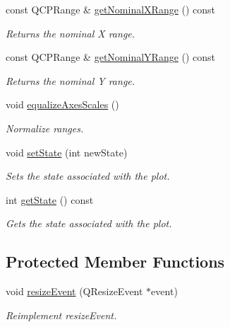 \begin{DoxyCompactItemize}
const Q\+C\+P\+Range \& \hyperlink{classSGCustomPlot_abc4224d3185bed305f40646626e30625}{get\+Nominal\+X\+Range} () const
\begin{DoxyCompactList}\small\item\em Returns the nominal X range. \end{DoxyCompactList}\item 
\mbox{\label{classSGCustomPlot_a52e0a60a726ebd157839b013af068420}} 
const Q\+C\+P\+Range \& \hyperlink{classSGCustomPlot_a52e0a60a726ebd157839b013af068420}{get\+Nominal\+Y\+Range} () const
\begin{DoxyCompactList}\small\item\em Returns the nominal Y range. \end{DoxyCompactList}\item 
\mbox{\label{classSGCustomPlot_ae69a5b83aab673e813bc48c9e5b8a0bd}} 
void \hyperlink{classSGCustomPlot_ae69a5b83aab673e813bc48c9e5b8a0bd}{equalize\+Axes\+Scales} ()
\begin{DoxyCompactList}\small\item\em Normalize ranges. \end{DoxyCompactList}\item 
\mbox{\label{classSGCustomPlot_a7583d7141ffd1a751f01f22b23c50e5a}} 
void \hyperlink{classSGCustomPlot_a7583d7141ffd1a751f01f22b23c50e5a}{set\+State} (int new\+State)
\begin{DoxyCompactList}\small\item\em Sets the state associated with the plot. \end{DoxyCompactList}\item 
\mbox{\label{classSGCustomPlot_a5a23324945745f0af195e25b70814637}} 
int \hyperlink{classSGCustomPlot_a5a23324945745f0af195e25b70814637}{get\+State} () const
\begin{DoxyCompactList}\small\item\em Gets the state associated with the plot. \end{DoxyCompactList}\end{DoxyCompactItemize}
\subsection*{Protected Member Functions}
\begin{DoxyCompactItemize}
\item 
void \hyperlink{classSGCustomPlot_a4f1dee38be23b4b3fbe46cab9c6db6d7}{resize\+Event} (Q\+Resize\+Event $\ast$event)
\begin{DoxyCompactList}\small\item\em Reimplement resize\+Event. \end{DoxyCompactList}\end{DoxyCompactItemize}
